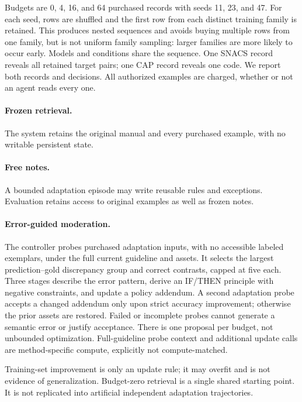 \documentclass[11pt]{article}
\begin{document}
Budgets are 0, 4, 16, and 64 purchased records with seeds 11, 23, and 47. For each seed, rows are shuffled and the first row from each distinct training family is retained. This produces nested sequences and avoids buying multiple rows from one family, but is not uniform family sampling: larger families are more likely to occur early. Models and conditions share the sequence. One SNACS record reveals all retained target pairs; one CAP record reveals one code. We report both records and decisions. All authorized examples are charged, whether or not an agent reads every one.

\paragraph{Frozen retrieval.} The system retains the original manual and every purchased example, with no writable persistent state.
\paragraph{Free notes.} A bounded adaptation episode may write reusable rules and exceptions. Evaluation retains access to original examples as well as frozen notes.
\paragraph{Error-guided moderation.} The controller probes purchased adaptation inputs, with no accessible labeled exemplars, under the full current guideline and assets. It selects the largest prediction--gold discrepancy group and correct contrasts, capped at five each. Three stages describe the error pattern, derive an IF/THEN principle with negative constraints, and update a policy addendum. A second adaptation probe accepts a changed addendum only upon strict accuracy improvement; otherwise the prior assets are restored. Failed or incomplete probes cannot generate a semantic error or justify acceptance. There is one proposal per budget, not unbounded optimization. Full-guideline probe context and additional update calls are method-specific compute, explicitly not compute-matched.

Training-set improvement is only an update rule; it may overfit and is not evidence of generalization. Budget-zero retrieval is a single shared starting point. It is not replicated into artificial independent adaptation trajectories.
\end{document}
